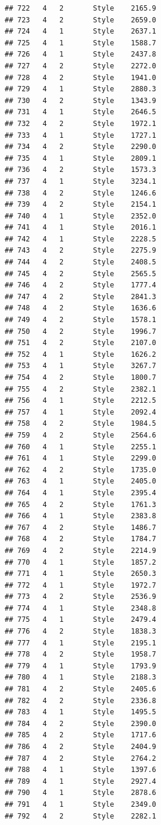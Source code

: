 \documentclass[12pt,]{krantz}
\theoremstyle{definition}
\theoremstyle{definition}
\theoremstyle{remark}
\begin{document}
\begin{verbatim}
## 722   4   2       Style    2165.9
## 723   4   2       Style    2659.0
## 724   4   1       Style    2637.1
## 725   4   1       Style    1588.7
## 726   4   1       Style    2437.8
## 727   4   2       Style    2272.0
## 728   4   2       Style    1941.0
## 729   4   1       Style    2880.3
## 730   4   2       Style    1343.9
## 731   4   1       Style    2646.5
## 732   4   2       Style    1972.1
## 733   4   1       Style    1727.1
## 734   4   2       Style    2290.0
## 735   4   1       Style    2809.1
## 736   4   2       Style    1573.3
## 737   4   1       Style    3234.1
## 738   4   2       Style    1246.6
## 739   4   2       Style    2154.1
## 740   4   1       Style    2352.0
## 741   4   1       Style    2016.1
## 742   4   1       Style    2228.5
## 743   4   2       Style    2275.9
## 744   4   2       Style    2408.5
## 745   4   2       Style    2565.5
## 746   4   2       Style    1777.4
## 747   4   2       Style    2841.3
## 748   4   2       Style    1636.6
## 749   4   2       Style    1578.1
## 750   4   2       Style    1996.7
## 751   4   2       Style    2107.0
## 752   4   1       Style    1626.2
## 753   4   1       Style    3267.7
## 754   4   2       Style    1800.7
## 755   4   2       Style    2382.1
## 756   4   1       Style    2212.5
## 757   4   1       Style    2092.4
## 758   4   2       Style    1984.5
## 759   4   2       Style    2564.6
## 760   4   1       Style    2255.1
## 761   4   1       Style    2299.0
## 762   4   2       Style    1735.0
## 763   4   1       Style    2405.0
## 764   4   1       Style    2395.4
## 765   4   2       Style    1761.3
## 766   4   1       Style    2383.8
## 767   4   2       Style    1486.7
## 768   4   2       Style    1784.7
## 769   4   2       Style    2214.9
## 770   4   1       Style    1857.2
## 771   4   1       Style    2650.3
## 772   4   1       Style    1972.7
## 773   4   2       Style    2536.9
## 774   4   1       Style    2348.8
## 775   4   1       Style    2479.4
## 776   4   2       Style    1838.3
## 777   4   1       Style    2195.1
## 778   4   2       Style    1958.7
## 779   4   1       Style    1793.9
## 780   4   1       Style    2188.3
## 781   4   2       Style    2405.6
## 782   4   2       Style    2336.8
## 783   4   1       Style    1495.5
## 784   4   2       Style    2390.0
## 785   4   2       Style    1717.6
## 786   4   2       Style    2404.9
## 787   4   2       Style    2764.2
## 788   4   1       Style    1397.6
## 789   4   1       Style    2927.4
## 790   4   1       Style    2878.6
## 791   4   1       Style    2349.0
## 792   4   2       Style    2282.1

\end{verbatim}
\end{document}
